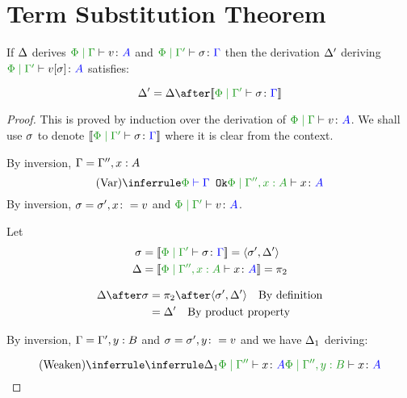 \documentclass{report}
\begin{document}
\chapter{Term Substitution Theorem}

\begin{theorem}
    If $\Delta$ derives $\gpetyperelation{v}{A}$ and $\etyperelation{\P}{\G'}{\si}{\G}$ then the derivation $\Delta'$ deriving $\etyperelation{\P}{\G'}{v\ssi}{A}$ satisfies:
    
    \begin{equation}
        \D' = \D \after\deno{\etyperelation{\P}{\G'}{\si}{\G}}
    \end{equation}
    
\end{theorem}

\begin{framed}
    \begin{proof}
        
        This is proved by induction over the derivation of $\etyperelation{\P}{\G}{v}{A}$.
        We shall use $\sigma$ to denote $\deno{\etyperelation{\P}{\G'}{\si}{\G}}$ where it is clear from the context.
        
        \case{\vvar}
        By inversion, $\Gamma = \Gamma'', x:A$
        \begin{equation}
            \ntreeruleI{\vvar}{\wellformedok{\P}{\G}}{\etyperelation{\P}{\G'', x:A}{x}{A}}
        \end{equation}
        By inversion, $\sigma = \sigma', x\colon= v$ and $\etyperelation{\P}{\G'}{v}{A}$.
        
        Let 
        \begin{align*}
            \si &=\deno{\etyperelation{\P}{\G'}{\si}{\G}} = \pr{\si'}{\D'}\\
            \D &=\deno{\etyperelation{\P}{\G'', x:A}{x}{A}} = \pp\\
        \end{align*}
        
        \begin{align*}
            \D\after\si &= \pp\after\pr{\si'}{\D'}\qt{By definition}\\
            &= \D'\qt{By product property}
        \end{align*}
        
        
        \case{\vweaken}
        By inversion, $\Gamma = \Gamma', y:B$ and $\sigma = \sigma', y\colon= v$
        and we have $\Delta_1$ deriving:
        
        \begin{equation}
            \ntreeruleI{\vweaken}{\treeruleI{\D_1}{\etyperelation{\P}{\G''}{x}{A}}}{\etyperelation{\P}{\G'',y: B}{x}{A}}
        \end{equation}
        

\end{proof}
\end{framed}
\end{document}
